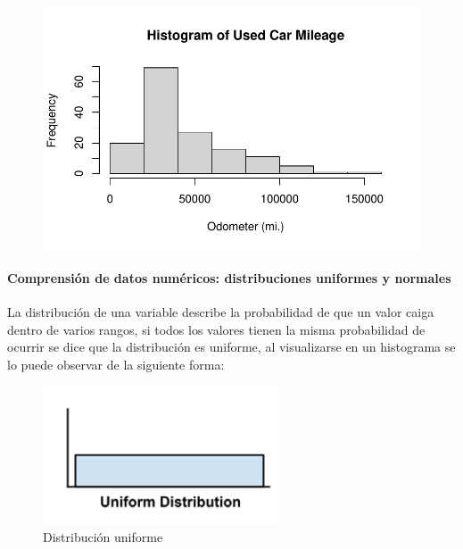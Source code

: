 \documentclass[
  letterpaper,
  DIV=11,
  numbers=noendperiod]{scrartcl}
\let\oldparagraph\paragraph
\renewcommand{\paragraph}[1]{\oldparagraph{#1}\mbox{}}
\begin{document}
\begin{figure}[H]

{\centering \includegraphics{Unidad1-resumen_files/figure-pdf/unnamed-chunk-55-2.pdf}

}

\end{figure}

\hypertarget{comprensiuxf3n-de-datos-numuxe9ricos-distribuciones-uniformes-y-normales}{%
\paragraph{Comprensión de datos numéricos: distribuciones uniformes y
normales}\label{comprensiuxf3n-de-datos-numuxe9ricos-distribuciones-uniformes-y-normales}}

La distribución de una variable describe la probabilidad de que un valor
caiga dentro de varios rangos, si todos los valores tienen la misma
probabilidad de ocurrir se dice que la distribución es uniforme, al
visualizarse en un histograma se lo puede observar de la siguiente
forma:

\begin{figure}

{\centering \includegraphics{distribucion uniforme.png}

}

\caption{Distribución uniforme}

\end{figure}
\end{document}
